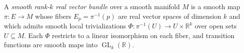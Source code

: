 
A \emph{smooth rank-$k$ real vector bundle} over a smooth manifold $M$ is a smooth map $\pi:E\to M$ whose fibers $E_p=\pi^{-1}(p)$ are real vector spaces of dimension $k$ and which admits smooth local trivializations $\Phi:\pi^{-1}(U)\to U\times\mathbb R^k$ over open sets $U\subseteq M$. Each $\Phi$ restricts to a linear isomorphism on each fiber, and transition functions are smooth maps into $\operatorname{GL}_k(\mathbb R)$.

